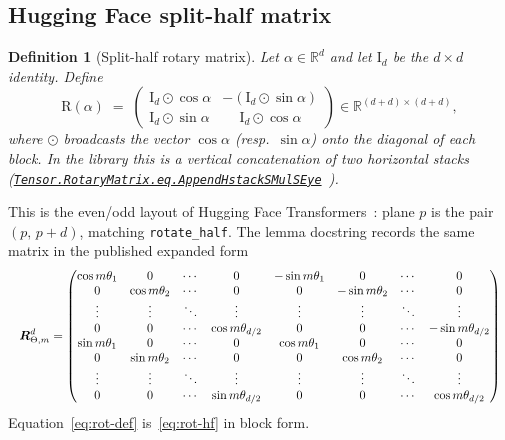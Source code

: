 \documentclass[11pt,a4paper]{article}
\newcommand{\lmod}[1]{\href{http://www.lemma.cn/lean/?module=#1}{\nolinkurl{#1}}}
\newtheorem{definition}[theorem]{Definition}
\newcommand{\R}{\mathbb{R}}
\newcommand{\rot}{\mathrm{R}}
\newcommand{\eye}{\mathrm{I}}
\begin{document}
\subsection{Hugging Face split-half matrix}
\label{sec:def-hf}

\begin{definition}[Split-half rotary matrix]
\label{def:rot}
Let \(\alpha\in\R^d\) and let \(\eye_d\) be the \(d\times d\) identity.
Define
\begin{equation}
  \label{eq:rot-def}
  \rot(\alpha)
  \;=\;
  \begin{pmatrix}
    \eye_d \odot \cos\alpha & -(\eye_d \odot \sin\alpha) \\
    \eye_d \odot \sin\alpha & \phantom{-}\eye_d \odot \cos\alpha
  \end{pmatrix}
  \in \R^{(d+d)\times(d+d)},
\end{equation}
where \(\odot\) broadcasts the vector \(\cos\alpha\) (resp.\ \(\sin\alpha\)) onto the diagonal of each block.
In the library this is a vertical concatenation of two horizontal stacks
(\lmod{Tensor.RotaryMatrix.eq.AppendHstackSMulSEye}~\cite{lemma_rope_hf_def}).
\end{definition}

This is the even/odd layout of Hugging Face Transformers~\cite{huggingface_rope_utils}: plane \(p\) is the pair \((p,\,p+d)\), matching \texttt{rotate\_half}.
The lemma docstring records the same matrix in the published expanded form
\begin{equation}
\label{eq:rot-hf}
\resizebox{\linewidth}{!}{\(\displaystyle
{\boldsymbol{R}}^{d}_{\Theta,m}=\begin{pmatrix}
\cos m\theta_{1} & 0 & \cdots & 0 & -\sin m\theta_{1} & 0 & \cdots & 0 \\
0 & \cos m\theta_{2} & \cdots & 0 & 0 & -\sin m\theta_{2} & \cdots & 0 \\
\vdots & \vdots & \ddots & \vdots & \vdots & \vdots & \ddots & \vdots \\
0 & 0 & \cdots & \cos m\theta_{d/2} & 0 & 0 & \cdots & -\sin m\theta_{d/2} \\
\sin m\theta_{1} & 0 & \cdots & 0 & \cos m\theta_{1} & 0 & \cdots & 0 \\
0 & \sin m\theta_{2} & \cdots & 0 & 0 & \cos m\theta_{2} & \cdots & 0 \\
\vdots & \vdots & \ddots & \vdots & \vdots & \vdots & \ddots & \vdots \\
0 & 0 & \cdots & \sin m\theta_{d/2} & 0 & 0 & \cdots & \cos m\theta_{d/2}
\end{pmatrix}
\)}
\end{equation}
Equation~\eqref{eq:rot-def} is~\eqref{eq:rot-hf} in block form.
\end{document}
